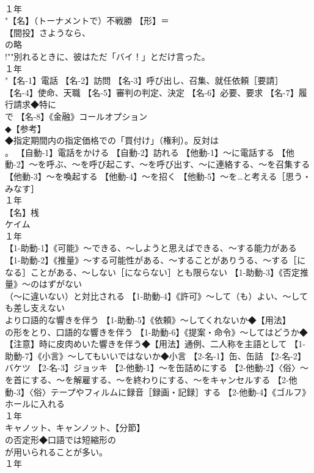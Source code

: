 \documentclass[8pt]{extreport}
\begin{document}
\begin{CJK}{UTF8}{min}
\\	１年	
\\	"【名】（トーナメントで）不戦勝 【形】＝ 
\\	【間投】さようなら、
\\	の略 
\\	!""別れるときに、彼はただ「バイ！」とだけ言った。
\\	１年	
\\	"【名-1】電話 【名-2】訪問 【名-3】呼び出し、召集、就任依頼［要請］ 【名-4】使命、天職 【名-5】審判の判定、決定 【名-6】必要、要求 【名-7】履行請求◆特に 
\\	で 【名-8】《金融》コールオプション
\\	◆【参考】
\\	◆指定期間内の指定価格での「買付け」（権利）。反対は 
\\	。 【自動-1】電話をかける 【自動-2】訪れる 【他動-1】～に電話する 【他動-2】～を呼ぶ、～を呼び起こす、～を呼び出す、～に連絡する、～を召集する 【他動-3】～を喚起する 【他動-4】～を招く 【他動-5】～を…と考える［思う・みなす］
\\	１年	
\\	【名】桟 
\\	ケイム
\\	１年	
\\	【1-助動-1】《可能》～できる、～しようと思えばできる、～する能力がある 【1-助動-2】《推量》～する可能性がある、～することがありうる、～する［になる］ことがある、～しない［にならない］とも限らない 【1-助動-3】《否定推量》～のはずがない
\\	（～に違いない）と対比される 【1-助動-4】《許可》～して（も）よい、～しても差し支えない
\\	より口語的な響きを伴う 【1-助動-5】《依頼》～してくれないか◆【用法】
\\	の形をとり、口語的な響きを伴う 【1-助動-6】《提案・命令》～してはどうか◆【注意】時に皮肉めいた響きを伴う◆【用法】通例、二人称を主語として 【1-助動-7】《小言》～してもいいではないか◆小言 【2-名-1】缶、缶詰 【2-名-2】バケツ 【2-名-3】ジョッキ 【2-他動-1】～を缶詰めにする 【2-他動-2】〈俗〉～を首にする、～を解雇する、～を終わりにする、～をキャンセルする 【2-他動-3】〈俗〉テープやフィルムに録音［録画・記録］する 【2-他動-4】《ゴルフ》ホールに入れる
\\	１年	
\\	キャノット、キャンノット、【分節】
\\	の否定形◆口語では短縮形の 
\\	が用いられることが多い。
\\	１年	

\end{CJK}
\end{document}
